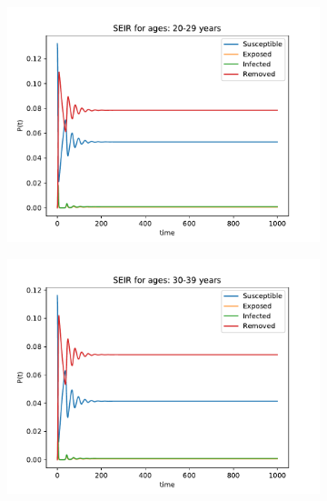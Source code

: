 \begin{figure}[H]
\begin{subfigure}{0.40\textwidth}
\includegraphics[width = \textwidth]{../fig/SEIR_20-29_n.pdf}
\caption{\protect}
\end{subfigure}
\begin{subfigure}{0.40\textwidth}
\includegraphics[width = \textwidth]{../fig/SEIR_30-39_n.pdf}
\caption{\protect}
\end{subfigure}
\begin{subfigure}{0.40\textwidth}

\end{subfigure}
\end{figure}
